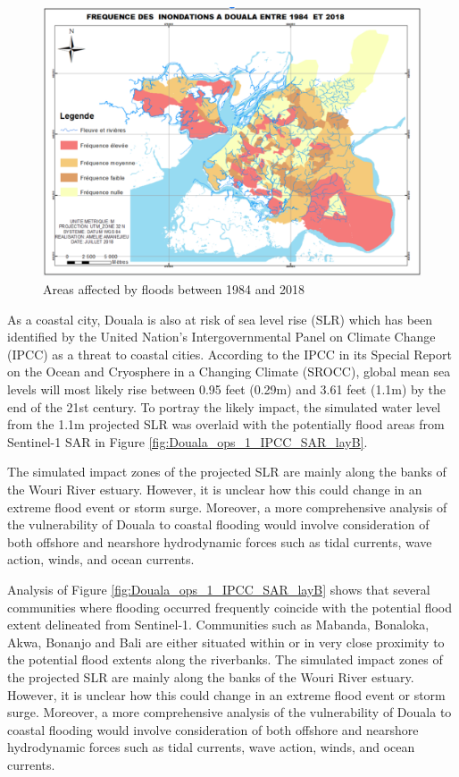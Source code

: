 \begin{figure} %
	\centering
	\includegraphics[width=0.45\linewidth]{figure/camfloo.PNG}
	\caption{Areas affected by floods between 1984 and 2018}
	\label{fig:Dcamfloo}
\end{figure}

As a coastal city, Douala is also at risk of sea level rise (SLR) which has been identified by the United Nation’s Intergovernmental Panel on Climate Change (IPCC) as a threat to coastal cities. According to the IPCC in its Special Report on the Ocean and Cryosphere in a Changing Climate (SROCC), global mean sea levels will most likely rise between 0.95 feet (0.29m) and 3.61 feet (1.1m) by the end of the 21st century\cite{meredith2019polar}. To portray the likely impact, the simulated water level from the 1.1m projected SLR was overlaid with the potentially flood areas from Sentinel-1 SAR in Figure \ref{fig:Douala_ops_1_IPCC_SAR_layB}. 

The simulated impact zones of the projected SLR are mainly along the banks of the Wouri River estuary. However, it is unclear how this could change in an extreme flood event or storm surge. Moreover, a more comprehensive analysis of the vulnerability of Douala to coastal flooding would involve consideration of both offshore and nearshore hydrodynamic forces such as tidal currents, wave action, winds, and ocean currents.

Analysis of Figure \ref{fig:Douala_ops_1_IPCC_SAR_layB} shows that several communities where flooding occurred frequently coincide with the potential flood extent delineated from Sentinel-1. Communities such as Mabanda, Bonaloka, Akwa, Bonanjo and Bali are either situated within or in very close proximity to the potential flood extents along the riverbanks.
The simulated impact zones of the projected SLR are mainly along the banks of the Wouri River estuary. However, it is unclear how this could change in an extreme flood event or storm surge. Moreover, a more comprehensive analysis of the vulnerability of Douala to coastal flooding would involve consideration of both offshore and nearshore hydrodynamic forces such as tidal currents, wave action, winds, and ocean currents.
